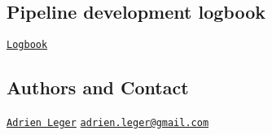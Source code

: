 \subsection*{Pipeline development logbook}


\begin{DoxyItemize}
\item \href{http://nbviewer.ipython.org/github/a-slide/IsFinder/blob/master/doc/Logbook.ipynb}{\tt Logbook}
\end{DoxyItemize}

\subsection*{Authors and Contact}

\href{https://github.com/a-slide}{\tt Adrien Leger} \href{mailto:adrien.leger@gmail.com}{\tt adrien.\-leger@gmail.\-com} 